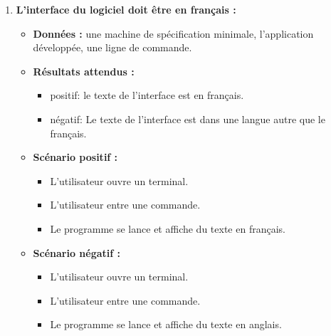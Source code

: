 \begin{enumerate}
    \item \textbf{L'interface du logiciel doit être en français :} 
    \begin{itemize}
        \item \textbf{Données :} une machine de spécification minimale, l'application développée, une ligne de commande.
        \item \textbf{Résultats attendus :} 
        \begin{itemize}
            \item positif: le texte de l'interface est en français.
            \item négatif: Le texte de l'interface est dans une langue autre que le français.
        \end{itemize}
        \item \textbf{Scénario positif :}
        \begin{itemize}
            \item L’utilisateur ouvre un terminal.
            \item L’utilisateur entre une commande.
            \item Le programme se lance et affiche du texte en français.
        \end{itemize}
        \item \textbf{Scénario négatif :}
        \begin{itemize}
            \item L’utilisateur ouvre un terminal.
            \item L’utilisateur entre une commande.
            \item Le programme se lance et affiche du texte en anglais.
        \end{itemize}
    \end{itemize}


\end{enumerate}
